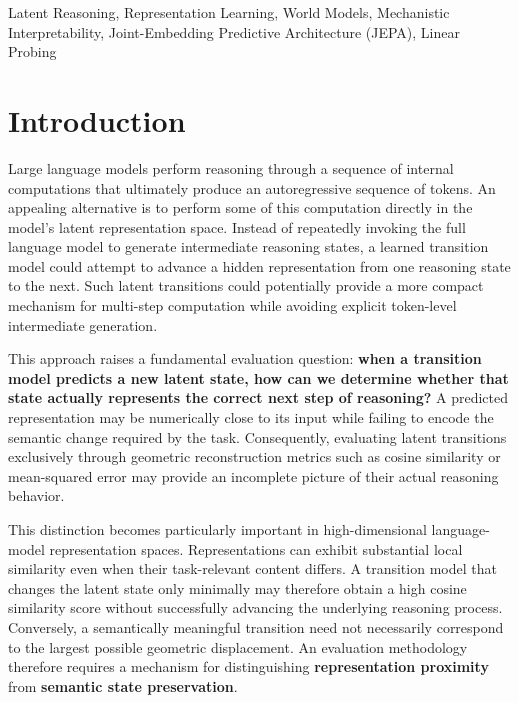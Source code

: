 \documentclass[conference]{IEEEtran}
\begin{document}
\begin{IEEEkeywords}
Latent Reasoning, Representation Learning, World Models, Mechanistic Interpretability, Joint-Embedding Predictive Architecture (JEPA), Linear Probing
\end{IEEEkeywords}

\section{Introduction}

Large language models perform reasoning through a sequence of internal computations that ultimately produce an autoregressive sequence of tokens. An appealing alternative is to perform some of this computation directly in the model's latent representation space. Instead of repeatedly invoking the full language model to generate intermediate reasoning states, a learned transition model could attempt to advance a hidden representation from one reasoning state to the next. Such latent transitions could potentially provide a more compact mechanism for multi-step computation while avoiding explicit token-level intermediate generation.

This approach raises a fundamental evaluation question: \textbf{when a transition model predicts a new latent state, how can we determine whether that state actually represents the correct next step of reasoning?} A predicted representation may be numerically close to its input while failing to encode the semantic change required by the task. Consequently, evaluating latent transitions exclusively through geometric reconstruction metrics such as cosine similarity or mean-squared error may provide an incomplete picture of their actual reasoning behavior.

This distinction becomes particularly important in high-dimensional language-model representation spaces. Representations can exhibit substantial local similarity even when their task-relevant content differs. A transition model that changes the latent state only minimally may therefore obtain a high cosine similarity score without successfully advancing the underlying reasoning process. Conversely, a semantically meaningful transition need not necessarily correspond to the largest possible geometric displacement. An evaluation methodology therefore requires a mechanism for distinguishing \textbf{representation proximity} from \textbf{semantic state preservation}.
\end{document}
